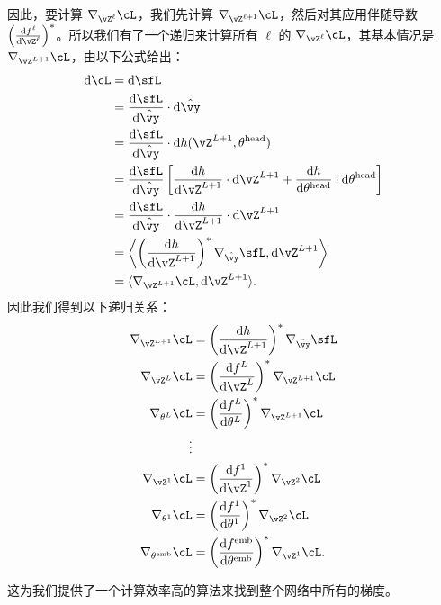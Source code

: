 \documentclass[../../book-main.tex]{subfiles}
\begin{document}
因此，要计算 \(\nabla_{\vZ^{\ell}}\cL\)，我们先计算 \(\nabla_{\vZ^{\ell + 1}}\cL\)，然后对其应用伴随导数 \(\bp{\odv{f^{\ell}}{\vZ^{\ell}}}^{*}\)。所以我们有了一个递归来计算所有 \(\ell\) 的 \(\nabla_{\vZ^{\ell}}\cL\)，其基本情况是 \(\nabla_{\vZ^{L + 1}}\cL\)，由以下公式给出：
\begin{align}
    \odif{\cL}
    &= \odif{\sfL} \\
    &= \odv{\sfL}{\hat{\vy}}\cdot\odif{\hat{\vy}} \\
    &= \odv{\sfL}{\hat{\vy}}\cdot\odif{{h(\vZ^{L + 1}, \theta^{\head})}} \\ 
    &= \odv{\sfL}{\hat{\vy}}\bs{\odv{h}{\vZ^{L + 1}}\cdot\odif{\vZ}^{L + 1} + \odv{h}{\theta^{\head}}\cdot\odif{\theta}^{\head}} \\ 
    &= \odv{\sfL}{\hat{\vy}}\cdot \odv{h}{\vZ^{L + 1}}\cdot\odif{\vZ}^{L + 1} \\ 
    &= \ip*{\bp{\odv{h}{\vZ^{L + 1}}}^{*}\nabla_{\hat{\vy}}\sfL}{\odif{\vZ}^{L + 1}} \\ 
    &= \ip{\nabla_{\vZ^{L + 1}}\cL}{\odif{\vZ}^{L + 1}}.
\end{align}
因此我们得到以下递归关系：
\begin{align}
    \nabla_{\vZ^{L + 1}}\cL 
    &= \bp{\odv{h}{\vZ^{L + 1}}}^{*}\nabla_{\hat{\vy}}\sfL \\ 
    \nabla_{\vZ^{L}}\cL 
    &= \bp{\odv{f^{L}}{\vZ^{L}}}^{*}\nabla_{\vZ^{L + 1}}\cL \\ 
    \nabla_{\theta^{L}}\cL
    &= \bp{\odv{f^{L}}{\theta^{L}}}^{*}\nabla_{\vZ^{L + 1}}\cL \\
    \vdots &  \\ 
    \nabla_{\vZ^{1}}\cL 
    &= \bp{\odv{f^{1}}{\vZ^{1}}}^{*}\nabla_{\vZ^{2}}\cL \\ 
    \nabla_{\theta^{1}}\cL 
    &= \bp{\odv{f^{1}}{\theta^{1}}}^{*}\nabla_{\vZ^{2}}\cL \\ 
    \nabla_{\theta^{\emb}}\cL 
    &= \bp{\odv{f^{\emb}}{\theta^{\emb}}}^{*}\nabla_{\vZ^{1}}\cL.
\end{align}

这为我们提供了一个计算效率高的算法来找到整个网络中所有的梯度。
\end{document}
